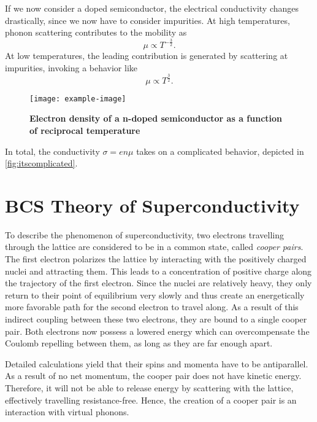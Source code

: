 If we now consider a doped semiconductor, the electrical conductivity changes drastically, since we now have to consider impurities.
At high temperatures, phonon scattering contributes to the mobility as
\begin{equation*}
	\mu \propto T^{-\frac{3}{2}}.
\end{equation*}
At low temperatures, the leading contribution is generated by scattering at impurities, invoking a behavior like
\begin{equation*}
	\mu \propto T^{\frac{3}{2}}.
\end{equation*}
\begin{figure}
	\centering
	\texttt{[image: example-image]}
	\caption[Electron density of a n-doped semiconductor as a function of reciprocal temperature]{\textbf{Electron density of a n-doped semiconductor as a function of reciprocal temperature}}
	\label{fig:itscomplicated}
\end{figure}

In total, the conductivity $\sigma = en\mu$ takes on a complicated behavior, depicted in \autoref{fig:itscomplicated}.

\section{BCS Theory of Superconductivity}
To describe the phenomenon of superconductivity, two electrons travelling through the lattice are considered to be in a common state, called \textit{cooper pairs}.
The first electron polarizes the lattice by interacting with the positively charged nuclei and attracting them.
This leads to a concentration of positive charge along the trajectory of the first electron.
Since the nuclei are relatively heavy, they only return to their point of equilibrium very slowly and thus create an energetically more favorable path for the second electron to travel along.
As a result of this indirect coupling between these two electrons, they are bound to a single cooper pair.
Both electrons now possess a lowered energy which can overcompensate the Coulomb repelling between them, as long as they are far enough apart.

Detailed calculations yield that their spins and momenta have to be antiparallel.
As a result of no net momentum, the cooper pair does not have kinetic energy.
Therefore, it will not be able to release energy by scattering with the lattice, effectively travelling resistance-free.
Hence, the creation of a cooper pair is an interaction with virtual phonons.

